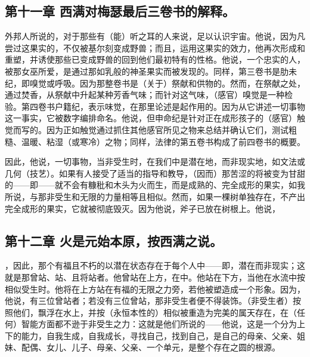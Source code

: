 
\subsection{第十一章 西满对梅瑟最后三卷书的解释。}

外邦人所说的，对于那些有（能）听之耳的人来说，足以认识宇宙。他说，因为凡尝过这果实的，不仅被基尔刻变成野兽；而且，运用这果实的效力，他再次形成和重塑，并诱使那些已变成野兽的回到他们最初特有的性格。他说，一个忠实的人，被那女巫所爱，是通过那如乳般的神圣果实而被发现的。同样，第三卷书是肋未纪，即嗅觉或呼吸。因为那整卷书是（关于）祭献和供物的。然而，在祭献之处，通过焚香，从祭献中升起某种芳香气味；而针对这气味，（感官）嗅觉是一种检验。第四卷书户籍纪，表示味觉，在那里论述是起作用的。因为从它讲述一切事物这一事实，它被数字编排命名。他说，但申命纪是针对正在成形孩子的（感官）触觉而写的。因为正如触觉通过抓住其他感官所见之物来总结并确认它们，测试粗糙、温暖、粘湿（或寒冷）之物；同样，法律的第五卷书构成了前四卷书的概要。\par

因此，他说，一切事物，当非受生时，在我们中是潜在地，而非现实地，如文法或几何（技艺）。如果有人接受了适当的指导和教导，（因而）那苦涩的将被变为甘甜的——即——就不会有糠秕和木头为火而生，而是成熟的、完全成形的果实，如我所说，与那非受生和无限的力量相等且相似。然而，如果一棵树单独存在，不产出完全成形的果实，它就被彻底毁灭。因为他说，斧子已放在树根上。他说，\par


\subsection{第十二章 火是元始本原，按西满之说。}

，因此，那个有福且不朽的以潜在状态存在于每个人中——即，潜在而非现实；这就是那曾站、站、且将站者。他曾站在上方，在中。他站在下方，当他在水流中按相似受生时。他将在上方站在有福的无限之力旁，若他被塑造成一个形象。因为，他说，有三位曾站者；若没有三位曾站，那非受生者便不得装饰。（非受生者）按照他们，飘浮在水上，并按（永恒本性的）相似被重造为完美的属天存在，在（任何）智能方面都不逊于非受生之力：这就是他们所说的——他说，这是一个分为上下的能力，自我生成，自我成长，寻找自己，找到自己，是自己的母亲、父亲、姐妹、配偶、女儿、儿子、母亲、父亲、一个单元，是整个存在之圆的根源。\par

